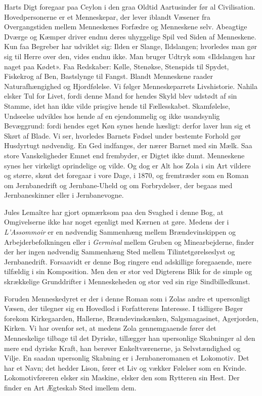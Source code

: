 \documentclass[12pt,a4paper]{article}
\begin{document}
Harts Digt foregaar paa Ceylon i den graa Oldtid Aartusinder før al
Civilisation. Hovedpersonerne er et Menneskepar, der lever iblandt
Væsener fra Overgangstiden mellem Menneskenes Forfædre og Menneskene
selv. Abeagtige Dværge og Kæmper driver endnu deres uhyggelige Spil ved
Siden af Menneskene. Kun faa Begreber har udviklet sig: Ilden er Slange,
Ildslangen; hvorledes man gør sig til Herre over den, vides endnu ikke.
Man bruger Udtryk som «Ildslangen har naget paa Kødet». Faa Redskaber:
Kølle, Stenøkse, Stenspids til Spydet, Fiskekrog af Ben, Bastslynge til
Fangst. Blandt Menneskene raader Naturafhængighed og Hjordfølelse. Vi
følger Menneskeparrets Livshistorie. Nahila elsker Tul for Livet, fordi
denne Mand for hendes Skyld blev udstødt af sin Stamme, idet han ikke
vilde prisgive hende til Fællesskabet. Skamfølelse, Undseelse udvikles
hos hende af en ejendommelig og ikke usandsynlig Bevæggrund: fordi hendes
eget Køn synes hende hæsligt: derfor laver hun sig et Skørt af Blade. Vi
ser, hvorledes Barnets Fødsel under bestemte Forhold gør Husdyrtugt
nødvendig. En Ged indfanges, der nærer Barnet med sin Mælk. Saa store
Vanskeligheder Emnet end frembyder, er Digtet ikke dumt. Menneskene synes
her virkeligt oprindelige og vilde. Og dog er Alt hos Zola i sin Art
vildere og større, skønt det foregaar i vore Dage, i 1870, og fremtræder
som en Roman om Jernbanedrift og Jernbane-Uheld og om Forbrydelser, der
begaas med Jernbaneskinner eller i Jernbanevogne.

Jules Lemaître har gjort opmærksom paa den Svaghed i denne Bog, at
Omgivelserne ikke har noget egenligt med Kærnen at gøre. Medens der i
\textit{L'Assommoir} er en nødvendig Sammenhæng mellem Brændevinskippen
og Arbejderbefolkningen eller i \textit{Germinal} mellem Gruben og
Minearbejderne, finder der her ingen nødvendig Sammenhæng Sted mellem
Tilintetgørelseslyst og Jernbanedrift. Forsaavidt er denne Bog ringere
end adskillige foregaaende, mere tilfældig i sin Komposition. Men den er
stor ved Digterens Blik for de simple og skrækkelige Grunddrifter i
Menneskeheden og stor ved sin rige Sindbilledkunst.

Foruden Menneskedyret er der i denne Roman som i Zolas andre et
upersonligt Væsen, der tilegner sig en Hovedlod i Forfatterens Interesse.
I tidligere Bøger forekom Kirkegaarden, Hallerne, Brændevinskænken,
Salgsmagasinet, Agerjorden, Kirken. Vi har ovenfor set, at medens Zola
gennemgaaende fører det Menneskelige tilbage til det Dyriske, tillægger
han upersonlige Skabninger al den mere end dyriske Kraft, han berøver
Enkeltværenerne, ja Selvstændighed og Vilje. En saadan upersonlig
Skabning er i Jernbaneromanen et Lokomotiv. Det har et Navn; det hedder
Lison, fører et Liv og vækker Følelser som en Kvinde. Lokomotivføreren
elsker sin Maskine, elsker den som Rytteren sin Hest. Der finder en Art
Ægteskab Sted imellem dem.
\end{document}
